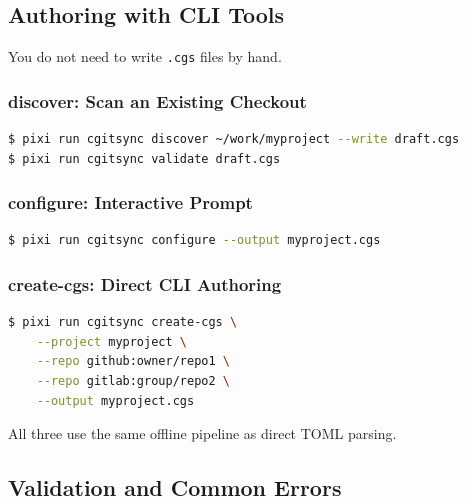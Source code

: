 \subsection{Authoring with CLI Tools}
\label{subsec:cgs-cli-authoring}

You do not need to write \texttt{.cgs} files by hand.

\subsubsection{discover: Scan an Existing Checkout}

\begin{lstlisting}[language=bash]
$ pixi run cgitsync discover ~/work/myproject --write draft.cgs
$ pixi run cgitsync validate draft.cgs
\end{lstlisting}

\subsubsection{configure: Interactive Prompt}

\begin{lstlisting}[language=bash]
$ pixi run cgitsync configure --output myproject.cgs
\end{lstlisting}

\subsubsection{create-cgs: Direct CLI Authoring}

\begin{lstlisting}[language=bash]
$ pixi run cgitsync create-cgs \
    --project myproject \
    --repo github:owner/repo1 \
    --repo gitlab:group/repo2 \
    --output myproject.cgs
\end{lstlisting}

All three use the same offline pipeline as direct TOML parsing.

\subsection{Validation and Common Errors}
\label{subsec:cgs-validation}

